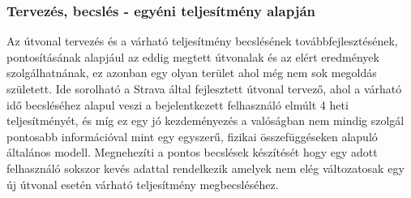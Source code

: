 \subsubsection{Tervezés, becslés - egyéni teljesítmény alapján} 
Az útvonal tervezés és a várható teljesítmény becslésének továbbfejlesztésének, pontosításának alapjául az eddig megtett útvonalak és az elért eredmények szolgálhatnának, ez azonban egy olyan terület ahol még nem sok megoldás született. Ide sorolható a Strava által fejlesztett útvonal tervező, ahol a várható idő becsléséhez alapul veszi a bejelentkezett felhasználó elmúlt 4 heti teljesítményét, és míg ez egy jó kezdeményezés a valóságban nem mindig szolgál pontosabb információval mint egy egyszerű, fizikai összefüggéseken alapuló általános modell. Megnehezíti a pontos becslések készítését hogy egy adott felhasználó sokszor kevés adattal rendelkezik amelyek nem elég változatosak egy új útvonal esetén várható teljesítmény megbecsléséhez.\\[12pt]


